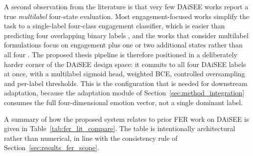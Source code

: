A second observation from the literature is that very few DAiSEE works report a true \emph{multilabel} four-state evaluation. Most engagement-focused works simplify the task to a single-label four-class engagement classifier, which is easier than predicting four overlapping binary labels \cite{abedi_improving_2021,mehta_three-dimensional_2022,su_leveraging_2024}, and the works that consider multilabel formulations focus on engagement plus one or two additional states rather than all four \cite{rianto_engagement_2025,fu_integrating_2025,asaju_adaptive_2022}. The proposed thesis pipeline is therefore positioned in a deliberately harder corner of the DAiSEE design space: it commits to all four DAiSEE labels at once, with a multilabel sigmoid head, weighted BCE, controlled oversampling and per-label thresholds. This is the configuration that is needed for downstream adaptation, because the adaptation module of Section~\ref{sec:method_integration} consumes the full four-dimensional emotion vector, not a single dominant label.

A summary of how the proposed system relates to prior FER work on DAiSEE is given in Table~\ref{tab:fer_lit_compare}. The table is intentionally architectural rather than numerical, in line with the consistency rule of Section~\ref{sec:results_fer_scope}.

